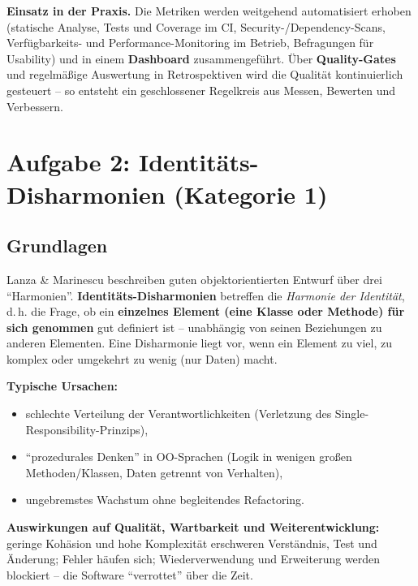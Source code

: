 \documentclass[
	fontsize=12pt,          %
	paper=a4,               %
	numbers=noenddot,       %
	listof=totoc,           %
	listof=entryprefix,     %
	listof=nochaptergap,    %
	bibliography=totoc,     %
	parskip=half,           %
	openany                 %
]{scrbook}
\begin{document}
\textbf{Einsatz in der Praxis.}
Die Metriken werden weitgehend automatisiert erhoben (statische Analyse, Tests
und Coverage im CI, Security-/Dependency-Scans, Verfügbarkeits- und
Performance-Monitoring im Betrieb, Befragungen für Usability) und in einem
\textbf{Dashboard} zusammengeführt. Über
\textbf{Quality-Gates} und regelmäßige Auswertung in Retrospektiven wird die
Qualität kontinuierlich gesteuert -- so entsteht ein geschlossener Regelkreis
aus Messen, Bewerten und Verbessern.



\chapter*{Aufgabe 2: Identitäts-Disharmonien (Kategorie 1)}

\section*{Grundlagen}

Lanza \& Marinescu beschreiben guten objektorientierten Entwurf über drei
``Harmonien''. \textbf{Identitäts-Disharmonien} betreffen die \emph{Harmonie der
Identität}, d.\,h. die Frage, ob ein \textbf{einzelnes Element (eine Klasse oder
Methode) für sich genommen} gut definiert ist -- unabhängig von seinen
Beziehungen zu anderen Elementen. Eine Disharmonie liegt vor, wenn ein Element
zu viel, zu komplex oder umgekehrt zu wenig (nur Daten) macht.

\textbf{Typische Ursachen:}
\begin{itemize}
	\item schlechte Verteilung der Verantwortlichkeiten (Verletzung des Single-
	      Responsibility-Prinzips),
	\item ``prozedurales Denken'' in OO-Sprachen (Logik in wenigen großen
	      Methoden/Klassen, Daten getrennt von Verhalten),
	\item ungebremstes Wachstum ohne begleitendes Refactoring.
\end{itemize}

\textbf{Auswirkungen auf Qualität, Wartbarkeit und Weiterentwicklung:}
geringe Kohäsion und hohe Komplexität erschweren Verständnis, Test und Änderung;
Fehler häufen sich; Wiederverwendung und Erweiterung werden blockiert -- die
Software ``verrottet'' über die Zeit.
\end{document}
